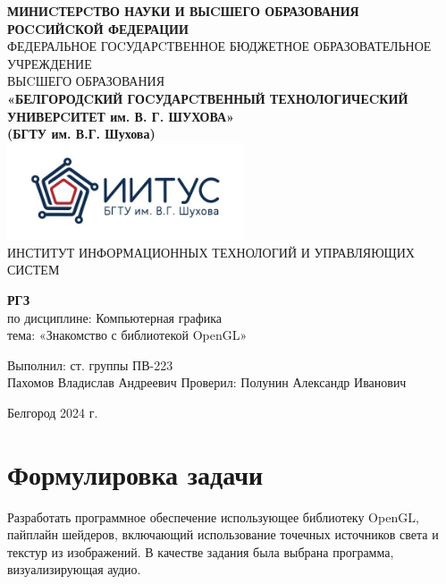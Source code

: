 \documentclass[a4paper,14pt]{extarticle}
\newcommand\textbox[1]{
	\parbox{.45\textwidth}{#1}
}
\begin{document}
\begin{center}
    \small{
        \textbf{МИНИCТЕРCТВО НАУКИ И ВЫCШЕГО ОБРАЗОВАНИЯ РОCCИЙCКОЙ ФЕДЕРАЦИИ}\\
        ФЕДЕРАЛЬНОЕ ГОCУДАРCТВЕННОЕ БЮДЖЕТНОЕ ОБРАЗОВАТЕЛЬНОЕ УЧРЕЖДЕНИЕ\\ВЫCШЕГО ОБРАЗОВАНИЯ \\
        \textbf{«БЕЛГОРОДCКИЙ ГОCУДАРCТВЕННЫЙ ТЕХНОЛОГИЧЕCКИЙ\\УНИВЕРCИТЕТ им. В. Г. ШУХОВА»\\ (БГТУ им. В.Г. Шухова)} \\
        \bigbreak
        \includegraphics[width=70mm]{log}\\
        ИНСТИТУТ ИНФОРМАЦИОННЫХ ТЕХНОЛОГИЙ И УПРАВЛЯЮЩИХ СИСТЕМ\\}
\end{center}

\vfill
\begin{center}
    \large{
        \textbf{
            РГЗ}}\\
    \normalsize{
        по дисциплине: Компьютерная графика \\
        тема: «Знакомство с библиотекой OpenGL»}
\end{center}
\vfill
\hfill\textbox{
    Выполнил: ст. группы ПВ-223\\Пахомов Владислав Андреевич
    \bigbreak
    Проверил: Полунин Александр Иванович
}
\vfill\begin{center}
    Белгород 2024 г.
\end{center}
\newpage

\renewcommand{\contentsname}{Оглавление}
\tableofcontents\newpage

\section{Формулировка задачи}
Разработать программное обеспечение использующее библиотеку OpenGL, пайплайн шейдеров, 
включающий использование точечных источников света и текстур из изображений. \bigbreak
В качестве задания была выбрана программа, визуализирующая аудио.
\end{document}
